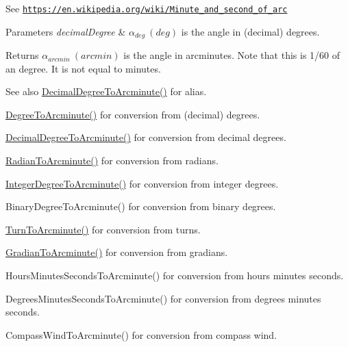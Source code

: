 See \href{https://en.wikipedia.org/wiki/Minute_and_second_of_arc}{\tt https\+://en.\+wikipedia.\+org/wiki/\+Minute\+\_\+and\+\_\+second\+\_\+of\+\_\+arc} 
\begin{DoxyParams}{Parameters}
{\em decimal\+Degree} & $\alpha_{deg}\ (deg)$ is the angle in (decimal) degrees. \\
\hline
\end{DoxyParams}
\begin{DoxyReturn}{Returns}
$\alpha_{arcmin}\ (arcmin)$ is the angle in arcminutes. Note that this is 1/60 of an degree. It is not equal to minutes. 
\end{DoxyReturn}
\begin{DoxySeeAlso}{See also}
\mbox{\hyperlink{group___e_g_x_math-_angle_conversions-_decimal_degree_ga6b6ea6e45d2a13f556824ca419cc9fbd}{Decimal\+Degree\+To\+Arcminute()}} for alias. 

\mbox{\hyperlink{group___e_g_x_math-_angle_conversions-_degree_ga8abf327dc5f52907b2c881999e9cc43e}{Degree\+To\+Arcminute()}} for conversion from (decimal) degrees. 

\mbox{\hyperlink{group___e_g_x_math-_angle_conversions-_decimal_degree_ga6b6ea6e45d2a13f556824ca419cc9fbd}{Decimal\+Degree\+To\+Arcminute()}} for conversion from decimal degrees. 

\mbox{\hyperlink{group___e_g_x_math-_angle_conversions-_radian_ga722e3b8e78540a6b3942b73b64aeb8d2}{Radian\+To\+Arcminute()}} for conversion from radians. 

\mbox{\hyperlink{group___e_g_x_math-_angle_conversions-_integer_degree_ga78b014e7649d666a3647c467e64e4fe8}{Integer\+Degree\+To\+Arcminute()}} for conversion from integer degrees. 

Binary\+Degree\+To\+Arcminute() for conversion from binary degrees. 

\mbox{\hyperlink{group___e_g_x_math-_angle_conversions-_turn_ga72cda928d9043c7d82097b1a7920769e}{Turn\+To\+Arcminute()}} for conversion from turns. 

\mbox{\hyperlink{group___e_g_x_math-_angle_conversions-_gradian_ga67ef7daad49b0d73c39c52d426ab46a5}{Gradian\+To\+Arcminute()}} for conversion from gradians. 

Hours\+Minutes\+Seconds\+To\+Arcminute() for conversion from hours minutes seconds. 

Degrees\+Minutes\+Seconds\+To\+Arcminute() for conversion from degrees minutes seconds. 

Compass\+Wind\+To\+Arcminute() for conversion from compass wind. 
\end{DoxySeeAlso}
\mbox{\label{group___e_g_x_math-_angle_conversions-_degree_gaf85e2d765c248f447854a807a68a5de8}} 
